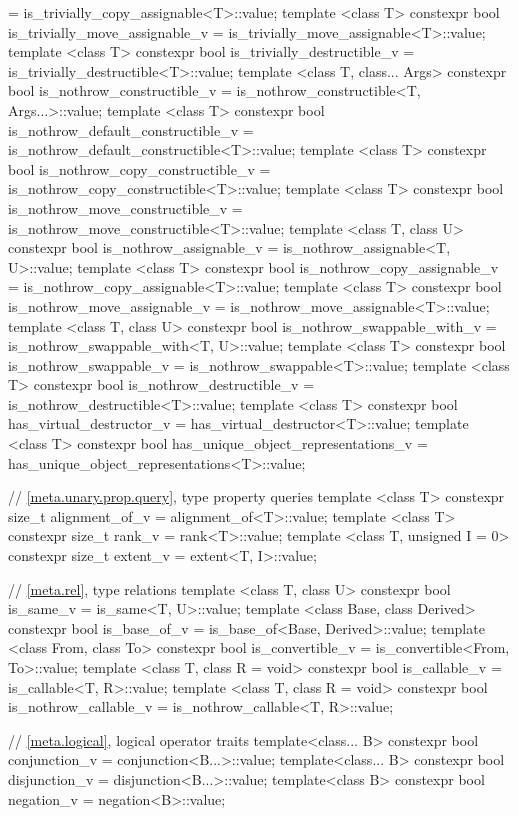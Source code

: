 \begin{codeblock}
{    = is_trivially_copy_assignable<T>::value;
  template <class T> constexpr bool is_trivially_move_assignable_v
    = is_trivially_move_assignable<T>::value;
  template <class T> constexpr bool is_trivially_destructible_v
    = is_trivially_destructible<T>::value;
  template <class T, class... Args> constexpr bool is_nothrow_constructible_v
    = is_nothrow_constructible<T, Args...>::value;
  template <class T> constexpr bool is_nothrow_default_constructible_v
    = is_nothrow_default_constructible<T>::value;
  template <class T> constexpr bool is_nothrow_copy_constructible_v
    = is_nothrow_copy_constructible<T>::value;
  template <class T> constexpr bool is_nothrow_move_constructible_v
    = is_nothrow_move_constructible<T>::value;
  template <class T, class U> constexpr bool is_nothrow_assignable_v
    = is_nothrow_assignable<T, U>::value;
  template <class T> constexpr bool is_nothrow_copy_assignable_v
    = is_nothrow_copy_assignable<T>::value;
  template <class T> constexpr bool is_nothrow_move_assignable_v
    = is_nothrow_move_assignable<T>::value;
  template <class T, class U> constexpr bool is_nothrow_swappable_with_v
    = is_nothrow_swappable_with<T, U>::value;
  template <class T> constexpr bool is_nothrow_swappable_v
    = is_nothrow_swappable<T>::value;
  template <class T> constexpr bool is_nothrow_destructible_v
    = is_nothrow_destructible<T>::value;
  template <class T> constexpr bool has_virtual_destructor_v
    = has_virtual_destructor<T>::value;
  template <class T> constexpr bool has_unique_object_representations_v
    = has_unique_object_representations<T>::value;

  // \ref{meta.unary.prop.query}, type property queries
  template <class T> constexpr size_t alignment_of_v
    = alignment_of<T>::value;
  template <class T> constexpr size_t rank_v
    = rank<T>::value;
  template <class T, unsigned I = 0> constexpr size_t extent_v
    = extent<T, I>::value;

  // \ref{meta.rel}, type relations
  template <class T, class U> constexpr bool is_same_v
    = is_same<T, U>::value;
  template <class Base, class Derived> constexpr bool is_base_of_v
    = is_base_of<Base, Derived>::value;
  template <class From, class To> constexpr bool is_convertible_v
    = is_convertible<From, To>::value;
  template <class T, class R = void> constexpr bool is_callable_v
    = is_callable<T, R>::value;
  template <class T, class R = void> constexpr bool is_nothrow_callable_v
    = is_nothrow_callable<T, R>::value;

  // \ref{meta.logical}, logical operator traits
  template<class... B> constexpr bool conjunction_v = conjunction<B...>::value;
  template<class... B> constexpr bool disjunction_v = disjunction<B...>::value;
  template<class B> constexpr bool negation_v = negation<B>::value;
}
\end{codeblock}

